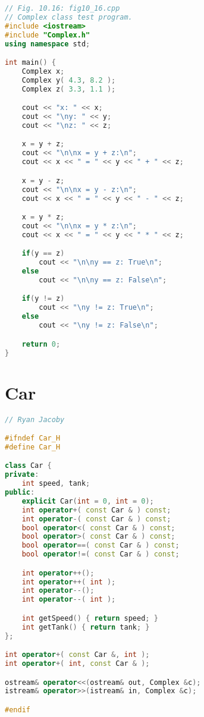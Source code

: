 \documentclass[letterpaper, 11pt]{article}
\begin{document}
\begin{lstlisting}[language=c++, caption=fig10\_16.cpp (modified)]
// Fig. 10.16: fig10_16.cpp
// Complex class test program.
#include <iostream>
#include "Complex.h"
using namespace std;

int main() {
    Complex x;
    Complex y( 4.3, 8.2 );
    Complex z( 3.3, 1.1 );

    cout << "x: " << x;
    cout << "\ny: " << y;
    cout << "\nz: " << z;

    x = y + z;
    cout << "\n\nx = y + z:\n";
    cout << x << " = " << y << " + " << z;

    x = y - z;
    cout << "\n\nx = y - z:\n";
    cout << x << " = " << y << " - " << z;

    x = y * z;
    cout << "\n\nx = y * z:\n";
    cout << x << " = " << y << " * " << z;

    if(y == z) 
        cout << "\n\ny == z: True\n";
    else 
        cout << "\n\ny == z: False\n";

    if(y != z) 
        cout << "\ny != z: True\n";
    else 
        cout << "\ny != z: False\n";

    return 0;
}
\end{lstlisting}

\section{Car}

\begin{lstlisting}[language=c++, caption=Car.h]
// Ryan Jacoby

#ifndef Car_H
#define Car_H

class Car {
private:
    int speed, tank;
public:
    explicit Car(int = 0, int = 0);
    int operator+( const Car & ) const;
    int operator-( const Car & ) const;
    bool operator<( const Car & ) const;
    bool operator>( const Car & ) const;
    bool operator==( const Car & ) const;
    bool operator!=( const Car & ) const;

    int operator++();
    int operator++( int );
    int operator--();
    int operator--( int );

    int getSpeed() { return speed; }
    int getTank() { return tank; }
};

int operator+( const Car &, int );
int operator+( int, const Car & );

ostream& operator<<(ostream& out, Complex &c);
istream& operator>>(istream& in, Complex &c);

#endif
\end{lstlisting}
\end{document}
